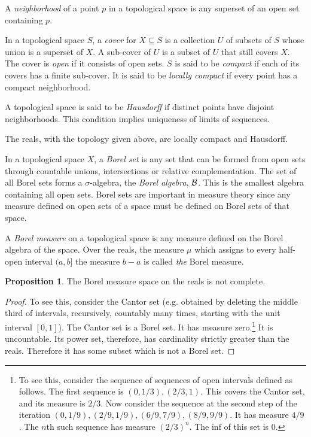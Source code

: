 \documentclass{article}
\theoremstyle{definition}
\newtheorem{proposition}[theorem]{Proposition}
\begin{document}
A {\em neighborhood} of a point \(p\) in a topological space is any superset of an open set containing \(p\).

In a topological space \(S\), a {\em cover} for \(X \subseteq S\) is a collection \(U\) of subsets of \(S\) whose union is a superset of \(X\). A sub-cover of \(U\) is a subset of \(U\) that still covers \(X\). The cover is {\em open} if it consists of open sets.  \(S\) is said to be {\em compact} if each of its covers has a finite sub-cover. It is said to be {\em locally compact} if every point has a compact neighborhood.

A topological space is said to be {\em Hausdorff} if distinct points have disjoint neighborhoods. This condition implies uniqueness of limits of sequences.

The reals, with the topology given above, are locally compact and Hausdorff.

In a topological space \(X\), a {\em Borel set} is any set that can be formed from open sets through countable unions, intersections or relative complementation. The set of all Borel sets forms a \(\sigma\)-algebra, the {\em Borel algebra}, \({\cal B}\). This is the smallest algebra containing all open sets. Borel sets are important in measure theory since any measure defined on open sets of a space must be defined on Borel sets of that space.

A {\em Borel measure} on a topological space is any measure defined on the Borel algebra of the space. Over the reals, the measure \(\mu\) which assigns to every half-open interval \((a,b]\) the measure \(b-a\) is called {\em the} Borel measure.

\begin{proposition}
The Borel measure space on the reals is not complete.  
\end{proposition}

\begin{proof}
To see this, consider the Cantor set (e.g.{} obtained by deleting the middle third of intervals, recursively, countably many times, starting with the unit interval \([0,1]\)). The Cantor set is a Borel set. It has measure zero.\footnote{To see this, consider the sequence of sequences of open intervals defined as follows. The first sequence is \((0,1/3),(2/3,1)\). This covers the Cantor set, and its measure is \(2/3\). Now consider the sequence at the second step of the iteration \((0,1/9),(2/9,1/9), (6/9,7/9),(8/9,9/9)\). It has measure \(4/9\). The \(n\)th such sequence has measure \((2/3)^n\). The inf of this set is \(0\).} It is uncountable. Its power set, therefore, has cardinality strictly greater than the reals. Therefore it has some subset which is not a Borel set.
\end{proof}
\end{document}
